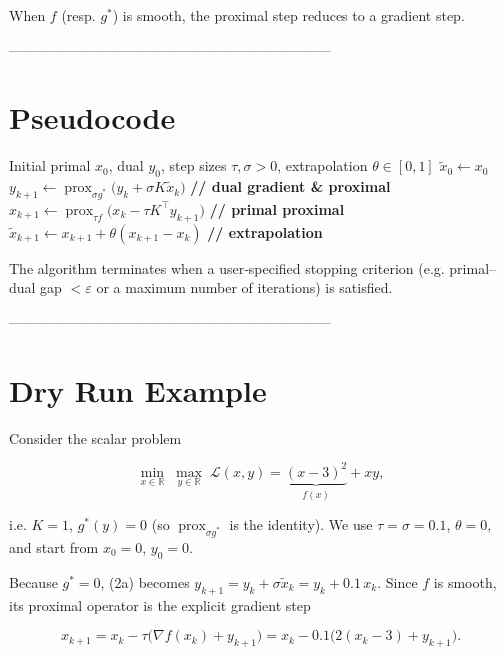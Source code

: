 \documentclass{article}
\begin{document}
When $f$ (resp. $g^{*}$) is smooth, the proximal step reduces to a gradient step.

---------------------------------------------------------------------

\section*{Pseudocode}
\begin{algorithm}[H]
\caption{Primal–Dual Hybrid Gradient (PDHG)}
\begin{algorithmic}[1]
\Require Initial primal $x_{0}$, dual $y_{0}$, step sizes $\tau,\sigma>0$, extrapolation $\theta\in[0,1]$
\State $\tilde x_{0}\gets x_{0}$
    \State $y_{k+1}\gets \operatorname{prox}_{\sigma g^{*}}\!\bigl(y_{k}+ \sigma K\tilde x_{k}\bigr)$ \hfill\textbf{// dual gradient \& proximal}
    \State $x_{k+1}\gets \operatorname{prox}_{\tau f}\!\bigl(x_{k}-\tau K^{\!\top}y_{k+1}\bigr)$ \hfill\textbf{// primal proximal}
    \State $\tilde x_{k+1}\gets x_{k+1}+ \theta (x_{k+1}-x_{k})$ \hfill\textbf{// extrapolation}
\EndFor
\end{algorithmic}
\end{algorithm}

The algorithm terminates when a user‑specified stopping criterion (e.g. primal–dual gap $<\varepsilon$ or a maximum number of iterations) is satisfied.

---------------------------------------------------------------------

\section*{Dry Run Example}
Consider the scalar problem  

\[
\min_{x\in\mathbb R}\;\max_{y\in\mathbb R}\; \mathcal L(x,y)=\underbrace{(x-3)^{2}}_{f(x)}+xy,
\]

i.e. $K=1$, $g^{*}(y)=0$ (so $\operatorname{prox}_{\sigma g^{*}}$ is the identity).  
We use $\tau=\sigma=0.1$, $\theta=0$, and start from $x_{0}=0$, $y_{0}=0$.

Because $g^{*}=0$, (2a) becomes $y_{k+1}=y_{k}+ \sigma \tilde x_{k}=y_{k}+0.1\,x_{k}$.
Since $f$ is smooth, its proximal operator is the explicit gradient step  

\[
x_{k+1}=x_{k}-\tau\bigl(\nabla f(x_{k})+ y_{k+1}\bigr)
      =x_{k}-0.1\bigl(2(x_{k}-3)+y_{k+1}\bigr).
\]
\end{document}
